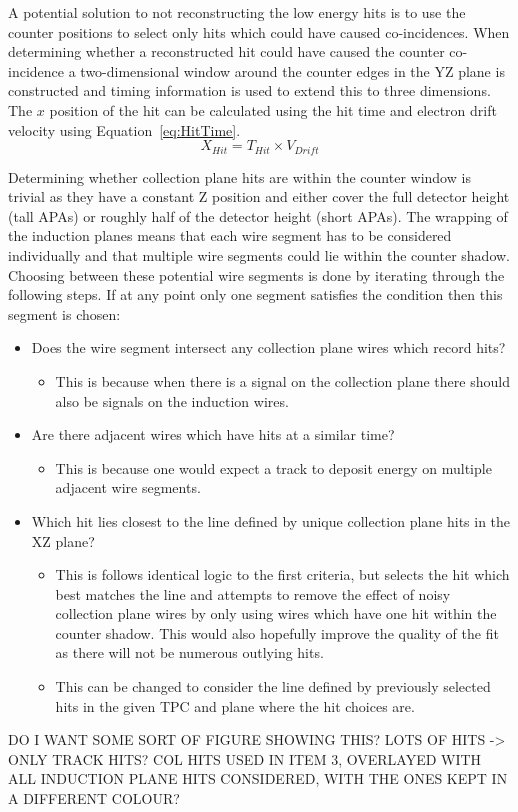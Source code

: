 A potential solution to not reconstructing the low energy hits is to use the counter positions to select only hits which could have caused co-incidences. When determining whether a reconstructed hit could have caused the counter co-incidence a two-dimensional window around the counter edges in the YZ plane is constructed and timing information is used to extend this to three dimensions.  The $x$ position of the hit can be calculated using the hit time and electron drift velocity using Equation~\ref{eq:HitTime}. \\
\begin{equation} \label{eq:HitTime}
  X_{Hit} = T_{Hit} \times V_{Drift}
\end{equation}

Determining whether collection plane hits are within the counter window is trivial as they have a constant Z position and either cover the full detector height (tall APAs) or roughly half of the detector height (short APAs). The wrapping of the induction planes means that each wire segment has to be considered individually and that multiple wire segments could lie within the counter shadow. Choosing between these potential wire segments is done by iterating through the following steps. If at any point only one segment satisfies the condition then this segment is chosen:
\begin{itemize}
\item Does the wire segment intersect any collection plane wires which record hits?
  \begin{itemize}
  \item This is because when there is a signal on the collection plane there should also be signals on the induction wires.
  \end{itemize}
\item Are there adjacent wires which have hits at a similar time?
  \begin{itemize}
  \item This is because one would expect a track to deposit energy on multiple adjacent wire segments. 
  \end{itemize}
\item Which hit lies closest to the line defined by unique collection plane hits in the XZ plane?
  \begin{itemize}
  \item This is follows identical logic to the first criteria, but selects the hit which best matches the line and attempts to remove the effect of noisy collection plane wires by only using wires which have one hit within the counter shadow. This would also hopefully improve the quality of the fit as there will not be numerous outlying hits.
  \item This can be changed to consider the line defined by previously selected hits in the given TPC and plane where the hit choices are.
  \end{itemize}
\end{itemize}
DO I WANT SOME SORT OF FIGURE SHOWING THIS? LOTS OF HITS -> ONLY TRACK HITS? COL HITS USED IN ITEM 3, OVERLAYED WITH ALL INDUCTION PLANE HITS CONSIDERED, WITH THE ONES KEPT IN A DIFFERENT COLOUR? \\

